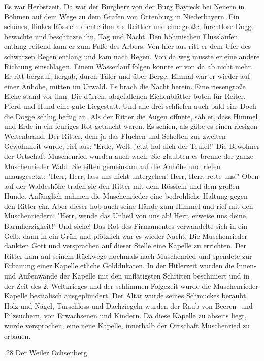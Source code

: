 Es war Herbstzeit. Da war der Burgherr von der Burg Bayreck bei Neuern in Böhmen
auf dem Wege zu dem Grafen von Ortenburg in Niederbayern. Ein schönes, flinkes
Rösslein diente ihm als Reittier und eine große, furchtlose Dogge bewachte und
beschützte ihn, Tag und Nacht. Den böhmischen Flussläufen entlang reitend kam er
zum Fuße des Arbers. Von hier aus ritt er dem Ufer des schwarzen Regen entlang
und kam nach Regen. Von da weg musste er eine andere Richtung einschlagen. Einem
Wasserlauf folgen konnte er von da ab nicht mehr. Er ritt bergauf, hergab, durch
Täler und über Berge. Einmal war er wieder auf einer Anhöhe, mitten im Urwald.
Es brach die Nacht herein. Eine riesengroße Eiche stand vor ihm. Die dürren,
abgefallenen Eichenblätter boten für Reiter, Pferd und Hund eine gute
Liegestatt. Und alle drei schliefen auch bald ein. Doch die Dogge schlug heftig
an. Als der Ritter die Augen öffnete, sah er, dass Himmel und Erde in ein
feuriges Rot getaucht waren. Es schien, als gäbe es einen riesigen Weltenbrand.
Der Ritter, dem ja das Fluchen und Schelten zur zweiten Gewohnheit wurde, rief
aus: "Erde, Welt, jetzt hol dich der Teufel!" Die Bewohner der Ortschaft
Muschenried wurden auch wach. Sie glaubten es brenne der ganze Muschenrieder
Wald. Sie eilten gemeinsam auf die Anhöhe und riefen unausgesetzt: "Herr, Herr,
lass uns nicht untergehen! Herr, Herr, rette uns!" Oben auf der Waldeshöhe
trafen sie den Ritter mit dem Rösslein und dem großen Hunde. Anfänglich nahmen
die Muschenrieder eine bedrohliche Haltung gegen den Ritter ein. Aber dieser hob
auch seine Hände zum Himmel und rief mit den Muschenriedern: "Herr, wende das
Unheil von uns ab! Herr, erweise uns deine Barmherzigkeit!" Und siehe! Das Rot
des Firmamentes verwandelte sich in ein Gelb, dann in ein Grün und plötzlich war
es wieder Nacht. Die Muschenrieder dankten Gott und versprachen auf dieser
Stelle eine Kapelle zu errichten. Der Ritter kam auf seinem Rückwege nochmals
nach Muschenried und spendete zur Erbauung einer Kapelle etliche Golddukaten. In
der Hitlerzeit wurden die Innen- und Außenwände der Kapelle mit den unflätigsten
Schriften beschmiert und in der Zeit des 2. Weltkrieges und der schlimmen
Folgezeit wurde die Muschenrieder Kapelle bestialisch ausgeplündert. Der Altar
wurde seines Schmuckes beraubt. Holz und Nägel, Türschloss und Dachziegeln
wurden der Raub von Beeren- und Pilzsuchern, von Erwachsenen und Kindern. Da
diese Kapelle zu abseits liegt, wurde versprochen, eine neue Kapelle, innerhalb
der Ortschaft Muschenried zu erbauen.

.28 Der Weiler Ochsenberg

